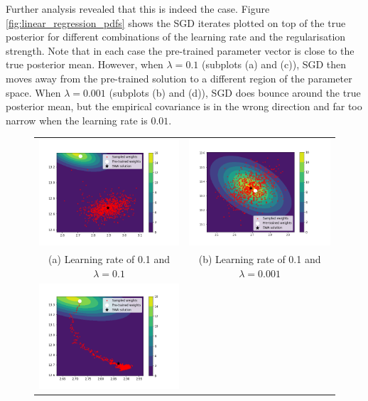 \documentclass[msc,deptreport.inf]{infthesis} %
\begin{document}
Further analysis revealed that this is indeed the case. Figure \ref{fig:linear_regression_pdfs} shows the SGD iterates plotted on top of the true posterior for different combinations of the learning rate and the regularisation strength. Note that in each case the pre-trained parameter vector is close to the true posterior mean. However, when $\lambda = 0.1$ (subplots (a) and (c)), SGD then moves away from the pre-trained solution to a different region of the parameter space. When $\lambda = 0.001$ (subplots (b) and (d)), SGD does bounce around the true posterior mean, but the empirical covariance is in the wrong direction and far too narrow when the learning rate is $0.01$.
\begin{figure}[!htbp] 
	\begin{tabular}{cc}
		\includegraphics[width=70mm]{plots/linear_model_weight_iterates__lr=0.1__lambda=0.1.png}
		& \includegraphics[width=70mm]{plots/linear_model_weight_iterates__lr=0.1__lambda=0.001.png} \\
		(a) Learning rate of 0.1 and $\lambda = 0.1$
		 & (b) Learning rate of 0.1 and $\lambda = 0.001$ \\[6pt] 
		 \includegraphics[width=70mm]{plots/linear_model_weight_iterates__lr=0.01__lambda=0.1.png}

\end{tabular}
\end{figure}
\end{document}
